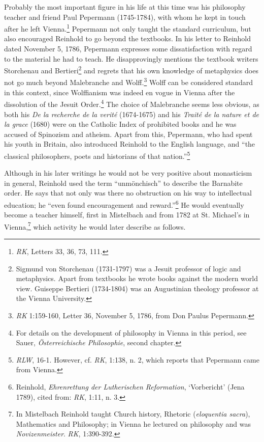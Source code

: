 Probably the most important figure in his life at this time was his philosophy teacher and friend Paul Pepermann (1745{-}1784), with whom he kept in touch after he left Vienna.\footnote{ \textit{RK}, Letters 33, 36, 73, 111.} Pepermann not only taught the standard curriculum, but also encouraged Reinhold to go beyond the textbooks. In his letter to Reinhold dated November 5, 1786, Pepermann expresses some dissatisfaction with regard to the material he had to teach. He disapprovingly mentions the textbook writers Storchenau and Bertieri\footnote{ Sigmund von Storchenau (1731{-}1797) was a Jesuit professor of logic and metaphysics. Apart from textbooks he wrote books against the modern world view. Guiseppe Bertieri (1734{-}1804) was an Augustinian theology professor at the Vienna University.} and regrets that his own knowledge of metaphysics does not go much beyond Malebranche and Wolff.\footnote{ \textit{RK} 1:159{-}160, Letter 36, November 5, 1786, from Don Paulus Pepermann. } Wolff can be considered standard in this context, since Wolffianism was indeed en vogue in Vienna after the dissolution of the Jesuit Order.\footnote{ For details on the development of philosophy in Vienna in this period, see Sauer, \textit{\"{O}sterreichische Philosophie}, second chapter. } The choice of Malebranche seems less obvious, as both his \textit{De la recherche de la verit\'{e}} (1674{-}1675) and his \textit{Trait\'{e} de la nature et de la grace} (1680) were on the Catholic Index of prohibited books and he was accused of Spinozism and atheism. Apart from this, Pepermann, who had spent his youth in Britain, also introduced Reinhold to the English language, and ``the classical philosophers, poets and historians of that nation.''\footnote{ \textit{RLW}, 16{-}1. However, cf. \textit{RK}, 1:138, n. 2, which reports that Pepermann came from Vienna. } 

Although in his later writings he would not be very positive about monasticism in general, Reinhold used the term ``unm\"{o}nchisch'' to describe the Barnabite order. He says that not only was there no obstruction on his way to intellectual education; he ``even found encouragement and reward.''\footnote{ Reinhold, \textit{Ehrenrettung der Lutherischen Reformation}, `Vorbericht' (Jena 1789), cited from: \textit{RK}, 1:11, n. 3. } He would eventually become a teacher himself, first in Mistelbach and from 1782 at St. Michael's in Vienna,\footnote{ In Mistelbach Reinhold taught Church history, Rhetoric (\textit{eloquentia sacra}), Mathematics and Philosophy; in Vienna he lectured on philosophy and was \textit{Novizenmeister}. \textit{RK}, 1:390{-}392.} which activity he would later describe as follows. 

